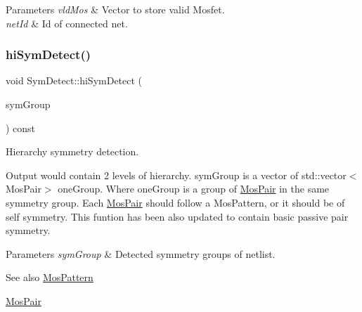 \begin{DoxyParams}{Parameters}
{\em vld\+Mos} & Vector to store valid Mosfet. \\
\hline
{\em net\+Id} & Id of connected net. \\
\hline
\end{DoxyParams}
\mbox{\label{classSymDetect_a81ec317ab0f508b3e0af483ef8a2c1ac}} 
\subsubsection{\texorpdfstring{hi\+Sym\+Detect()}{hiSymDetect()}}
{\footnotesize\ttfamily void Sym\+Detect\+::hi\+Sym\+Detect (\begin{DoxyParamCaption}\item[{std\+::vector$<$ std\+::vector$<$ \hyperlink{classMosPair}{Mos\+Pair} $>$$>$ \&}]{sym\+Group }\end{DoxyParamCaption}) const\hspace{0.3cm}{\ttfamily [private]}}



Hierarchy symmetry detection. 

Output would contain 2 levels of hierarchy. sym\+Group is a vector of std\+::vector$<$\+Mos\+Pair$>$ one\+Group. Where one\+Group is a group of \hyperlink{classMosPair}{Mos\+Pair} in the same symmetry group. Each \hyperlink{classMosPair}{Mos\+Pair} should follow a Mos\+Pattern, or it should be of self symmetry. This funtion has been also updated to contain basic passive pair symmetry.


\begin{DoxyParams}{Parameters}
{\em sym\+Group} & Detected symmetry groups of netlist. \\
\hline
\end{DoxyParams}
\begin{DoxySeeAlso}{See also}
\hyperlink{type_8h_af19eddb079bfea723256710b029c38e8}{Mos\+Pattern} 

\hyperlink{classMosPair}{Mos\+Pair} 
\end{DoxySeeAlso}
\mbox{\label{classSymDetect_ae6a1ba27f6768f215cba0623b6e2ce08}} 
